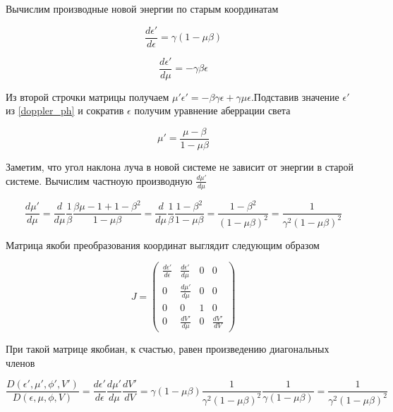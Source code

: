 Вычислим производные новой энергии по старым координатам

\begin{equation}
	\frac{d\epsilon'}{d\epsilon}=\gamma(1-\mu\beta)
\end{equation}

\begin{equation}
	\frac{d\epsilon'}{d\mu}=-\gamma\beta\epsilon
\end{equation}

Из второй строчки матрицы получаем $\mu'\epsilon'=-\beta\gamma\epsilon+\gamma\mu\epsilon$.Подставив значение $\epsilon'$ из \ref{doppler_ph} и сократив $\epsilon$ получим уравнение аберрации света

\begin{equation}\label{aberration_ph}
	\mu'=\frac{\mu-\beta}{1-\mu\beta}
\end{equation}

Заметим, что угол наклона луча в новой системе не зависит от энергии в старой системе. Вычислим частноую производную $\frac{d\mu'}{d\mu}$

\begin{equation}
	\frac{d\mu'}{d\mu}=\frac{d}{d\mu}\frac{1}{\beta}\frac{\beta\mu-1+1-\beta^2}{1-\mu\beta}=\frac{d}{d\mu}\frac{1}{\beta}\frac{1-\beta^2}{1-\mu\beta}=\frac{1-\beta^2}{(1-\mu\beta)^2}=\frac{1}{\gamma^2(1-\mu\beta)^2}
\end{equation}

Матрица якоби преобразования координат выглядит следующим образом

\begin{equation}
	J=\left(
	\begin{array}{cccc}
		\frac{d\epsilon'}{d\epsilon} & \frac{d\epsilon'}{d\mu}& 0 & 0\\
		0 & \frac{d\mu'}{d\mu} & 0 & 0\\
		0 & 0 & 1 & 0\\
		0 & \frac{dV'}{d\mu} & 0 & \frac{dV'}{dV}
	\end{array}
	\right)
\end{equation}

При такой матрице якобиан, к счастью, равен произведению диагональных членов

\begin{equation}\label{jacobian_ph}
	\frac{D(\epsilon',\mu',\phi',V')}{D(\epsilon,\mu,\phi,V)}=\frac{d\epsilon'}{d\epsilon}\frac{d\mu'}{d\mu}\frac{dV'}{dV}=\gamma(1-\mu\beta)\frac{1}{\gamma^2(1-\mu\beta)^2}\frac{1}{\gamma(1-\mu\beta)}=\frac{1}{\gamma^2(1-\mu\beta)^2}
\end{equation}

